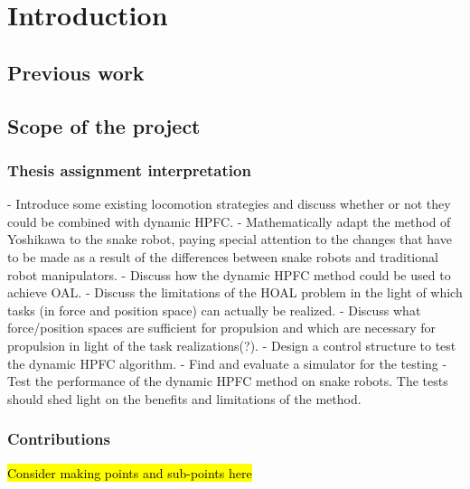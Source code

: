 
\chapter{Introduction}\label{Chapter:introduction}

\section{Previous work}

\section{Scope of the project}

\subsection{Thesis assignment interpretation}

- Introduce some existing locomotion strategies and discuss whether or not they could be combined with dynamic HPFC.
- Mathematically adapt the method of Yoshikawa to the snake robot, paying special attention to the changes that have to be made as a result of the differences between snake robots and traditional robot manipulators.
- Discuss how the dynamic HPFC method could be used to achieve OAL.
- Discuss the limitations of the HOAL problem in the light of which tasks (in force and position space) can actually be realized.
- Discuss what force/position spaces are sufficient for propulsion and which are necessary for propulsion in light of the task realizations(?).
- Design a control structure to test the dynamic HPFC algorithm.
- Find and evaluate a simulator for the testing
- Test the performance of the dynamic HPFC method on snake robots. The tests should shed light on the benefits and limitations of the method.

\subsection{Contributions}

\hl{Consider making points and sub-points here}

